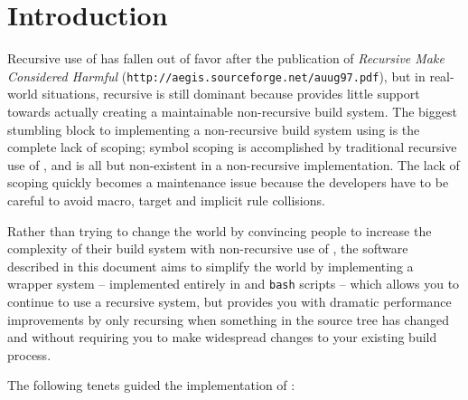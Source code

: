 %
%
%
%
\chapter{Introduction}

Recursive use of \make has fallen out of favor after the publication
of \emph{Recursive Make Considered Harmful}
(\texttt{http://aegis.sourceforge.net/auug97.pdf}), but in real-world
situations, recursive \make is still dominant because \make provides
little support towards actually creating a maintainable non-recursive
build system.  The biggest stumbling block to implementing a
non-recursive build system using \make is the complete lack of
scoping; symbol scoping is accomplished by traditional recursive use
of \make, and is all but non-existent in a non-recursive
implementation.  The lack of scoping quickly becomes a maintenance
issue because the \makefile developers have to be careful to avoid
macro, target and implicit rule collisions.

Rather than trying to change the world by convincing people to
increase the complexity of their build system with non-recursive use
of \make, the software described in this document aims to simplify the
world by implementing a wrapper system -- implemented entirely in
\gnumake and \texttt{bash} scripts -- which allows you to continue to
use a recursive \make system, but provides you with dramatic
performance improvements by only recursing when something in the
source tree has changed and without requiring you to make widespread
changes to your existing build process.

The following tenets guided the implementation of \lmsbw:

